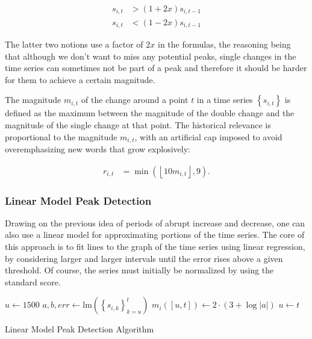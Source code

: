 \begin{align}
\label{eq:single-increase}
s_{i, t} &> \left( 1 + 2x \right) s_{i, t - 1}
\\
\label{eq:single-decrease}
s_{i, t} &< \left( 1 - 2x \right) s_{i, t - 1}
\end{align}

The latter two notions use a factor of $2x$ in the formulas, the reasoning being that although we don't want to miss any potential peaks, single changes in the time series can sometimes not be part of a peak and therefore it should be harder for them to achieve a certain magnitude.

The magnitude $m_{i, t}$ of the change around a point $t$ in a time series $\left\{ s_{i, t} \right\}$ is defined as the maximum between the magnitude of the double change and the magnitude of the single change at that point. The historical relevance is proportional to the magnitude $m_{i, t}$, with an artificial cap imposed to avoid overemphasizing new words that grow explosively:

\begin{align}
\label{eq:double-change-relevance}
r_{i, t} &= \min \left( \left\lfloor 10 m_{i, t} \right\rfloor, 9 \right).
\end{align}

\subsubsection{Linear Model Peak Detection}

Drawing on the previous idea of periods of abrupt increase and decrease, one can also use a linear model for approximating portions of the time series. The core of this approach is to fit lines to the graph of the time series using linear regression, by considering larger and larger intervals until the error rises above a given threshold. Of course, the series must initially be normalized by using the standard score.

\begin{algorithm}

\begin{algorithmic}[1]
    \State $u \gets 1500$
        \State $a, b, err \gets \textrm{lm} \left( \left\{ s_{i, k} \right\}_{k = u}^t \right)$
            \State $m_i \left( \left[ u, t \right] \right) \gets 2 \cdot \left( 3 + \log \left| a \right| \right)$
            \State $u \gets t$
        \EndIf
    \EndFor
\EndFor
\end{algorithmic}

\caption{Linear Model Peak Detection Algorithm}
\label{alg:linear-model}

\end{algorithm}

